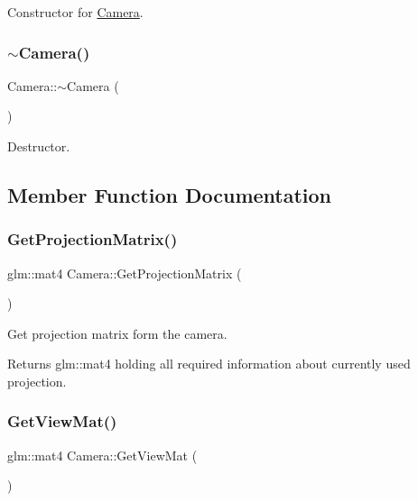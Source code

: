 Constructor for \mbox{\hyperlink{class_camera}{Camera}}. 

\mbox{\label{class_camera_ad1897942d0ccf91052386388a497349f}} 
\subsubsection{\texorpdfstring{$\sim$Camera()}{~Camera()}}
{\footnotesize\ttfamily Camera\+::$\sim$\+Camera (\begin{DoxyParamCaption}{ }\end{DoxyParamCaption})}



Destructor. 



\subsection{Member Function Documentation}
\mbox{\label{class_camera_ab0a4bf5a65d45f25529e3cffda1c361b}} 
\subsubsection{\texorpdfstring{GetProjectionMatrix()}{GetProjectionMatrix()}}
{\footnotesize\ttfamily glm\+::mat4 Camera\+::\+Get\+Projection\+Matrix (\begin{DoxyParamCaption}{ }\end{DoxyParamCaption})\hspace{0.3cm}{\ttfamily [inline]}}



Get projection matrix form the camera. 

\begin{DoxyReturn}{Returns}
glm\+::mat4 holding all required information about currently used projection. 
\end{DoxyReturn}
\mbox{\label{class_camera_a06b3f8e75270f4f2415f8591a315f231}} 
\subsubsection{\texorpdfstring{GetViewMat()}{GetViewMat()}}
{\footnotesize\ttfamily glm\+::mat4 Camera\+::\+Get\+View\+Mat (\begin{DoxyParamCaption}{ }\end{DoxyParamCaption})}



